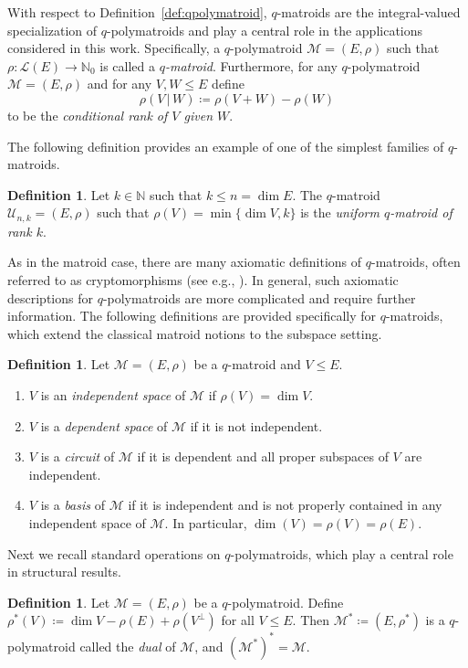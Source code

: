 \documentclass[onecolumn,draftclsnofoot,12pt]{IEEEtran}
\newcommand{\U}{\mathcal{U}}
\newcommand{\M}{\mathcal{M}}
\theoremstyle{plain} %
\theoremstyle{definition}
\newtheorem{definition}[theorem]{Definition}
\begin{document}
With respect to Definition~\ref{def:qpolymatroid}, $q$-matroids are the integral-valued specialization of $q$-polymatroids and play a central role in the applications considered in this work. Specifically, a $q$-polymatroid $\M=(E,\rho)$ such that $\rho\colon \mathcal{L}(E)\rightarrow \mathbb{N}_0$ is called a \textit{$q$-matroid}. Furthermore, for any $q$-polymatroid $\mathcal{M} = (E,\rho)$ and for any $V,W\leq E$ define $$\rho(V\,|\,W) \coloneqq \rho(V+W) - \rho(W)$$ to be the \textit{conditional rank of $V$ given $W$}.

The following definition provides an example of one of the simplest families of $q$-matroids.

\begin{definition} Let $k\in \mathbb{N}$ such that $k\leq n = \dim E$. The $q$-matroid $\U_{n,k}=(E,\rho)$ such that $\rho(V) = \min \{ \dim V, k\}$ is the \textit{uniform $q$-matroid of rank $k$}. \label{def:unif}
\end{definition}


As in the matroid case, there are many axiomatic definitions of $q$-matroids, often referred to as cryptomorphisms (see e.g.\cite{BYRNE2022149}, \cite{gordonmcnulty}). In general, such axiomatic descriptions for $q$-polymatroids are more complicated and require further information. The following definitions are provided specifically for $q$-matroids, which extend the classical matroid notions to the subspace setting.

\begin{definition} Let $\mathcal{M} = (E,\rho)$ be a $q$-matroid and $V\leq E$. 
\begin{enumerate}
    \item $V$ is an \textit{independent space} of $\M$ if $\rho(V) = \dim V$.
    \item $V$ is a \textit{dependent space} of $\M$ if it is not independent.
    \item $V$ is a \textit{circuit} of $\M$ if it is dependent and all proper subspaces of $V$ are independent.
    \item $V$ is a \textit{basis} of $\M$ if it is independent and is not properly contained in any independent space of $\M$. In particular, $\dim(V)=\rho(V)=\rho(E)$.
\end{enumerate}
\end{definition}

Next we recall standard operations on $q$-polymatroids, which play a central role in structural results.

\begin{definition}
    Let $\mathcal{M} = (E,\rho)$ be a $q$-polymatroid. Define $\rho^*(V) \coloneqq \dim V - \rho(E) + \rho(V^{\perp})$ for all $V\leq E$. Then $\mathcal{M}^* \coloneqq (E,\rho^*)$ is a $q$-polymatroid called the \textit{dual} of $\mathcal{M}$, and $(\mathcal{M}^*)^* = \mathcal{M}$.
\end{definition}
\end{document}
